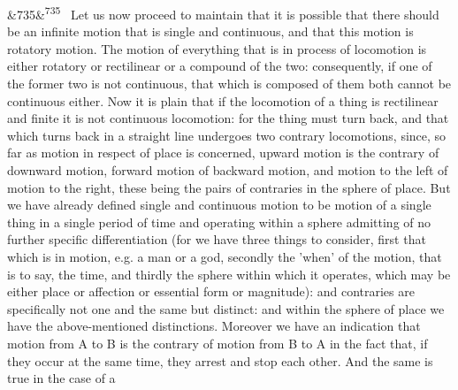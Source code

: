 \documentclass[12pt]{article}
\newcommand{\para}[1][]{\par\noindent\ifx&#1&\else\textsuperscript{\footnotesize #1}~\fi}
\begin{document}
\para[735] Let us now proceed to maintain that it is possible that there should be an infinite motion that is single and continuous, and that this motion is rotatory motion. The motion of everything that is in process of locomotion is either rotatory or rectilinear or a compound of the two: consequently, if one of the former two is not continuous, that which is composed of them both cannot be continuous either. Now it is plain that if the locomotion of a thing is rectilinear and finite it is not continuous locomotion: for the thing must turn back, and that which turns back in a straight line undergoes two contrary locomotions, since, so far as motion in respect of place is concerned, upward motion is the contrary of downward motion, forward motion of backward motion, and motion to the left of motion to the right, these being the pairs of contraries in the sphere of place. But we have already defined single and continuous motion to be motion of a single thing in a single period of time and operating within a sphere admitting of no further specific differentiation (for we have three things to consider, first that which is in motion, e.g. a man or a god, secondly the 'when' of the motion, that is to say, the time, and thirdly the sphere within which it operates, which may be either place or affection or essential form or magnitude): and contraries are specifically not one and the same but distinct: and within the sphere of place we have the above-mentioned distinctions. Moreover we have an indication that motion from A to B is the contrary of motion from B to A in the fact that, if they occur at the same time, they arrest and stop each other. And the same is true in the case of a
\end{document}
